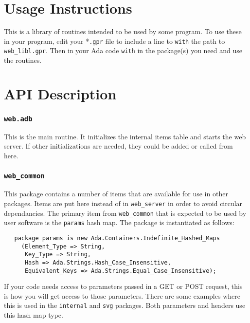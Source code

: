 \documentclass[10pt, openany]{book}
\newcommand{\keyword}[1]{\texttt{#1}}
\begin{document}
\chapter{Usage Instructions}
This is a library of routines intended to be used by some program.  To use these in your program, edit your *\keyword{.gpr} file to include a line to \keyword{with} the path to \keyword{web\_libl.gpr}.  Then in your Ada code \keyword{with} in the package(s) you need and use the routines.

\chapter{API Description}

\subsection{\texttt{web.adb}}
This is the main routine.  It initializes the internal items table and starts the web server.  If other initializations are needed, they could be added or called from here.

\subsection{\texttt{web\_common}}
This package contains a number of items that are available for use in other packages.  Items are put here instead of in \texttt{web\_server} in order to avoid circular dependancies.  The primary item from \texttt{web\_common} that is expected to be used by user software is the \texttt{params} hash map.  The package is instantiated as follows:
\begin{lstlisting}
   package params is new Ada.Containers.Indefinite_Hashed_Maps
     (Element_Type => String,
      Key_Type => String,
      Hash => Ada.Strings.Hash_Case_Insensitive,
      Equivalent_Keys => Ada.Strings.Equal_Case_Insensitive);
\end{lstlisting}
If your code needs access to parameters passed in a GET or POST request, this is how you will get access to those parameters.  There are some examples where this is used in the \texttt{internal} and \texttt{svg} packages.  Both parameters and headers use this hash map type.
\end{document}
